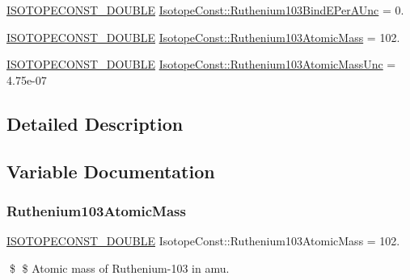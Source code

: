 \begin{DoxyCompactItemize}
\mbox{\hyperlink{group___isotope_const-_macros_ga8f45a7272ce02c0b4c65c44636ed719a}{I\+S\+O\+T\+O\+P\+E\+C\+O\+N\+S\+T\+\_\+\+D\+O\+U\+B\+LE}} \mbox{\hyperlink{group___isotope_const-_ruthenium-_ru103_ga6a4aaf13ef4a94b00440cd0dc87e8a78}{Isotope\+Const\+::\+Ruthenium103\+Bind\+E\+Per\+A\+Unc}} = 0.
\item 
\mbox{\hyperlink{group___isotope_const-_macros_ga8f45a7272ce02c0b4c65c44636ed719a}{I\+S\+O\+T\+O\+P\+E\+C\+O\+N\+S\+T\+\_\+\+D\+O\+U\+B\+LE}} \mbox{\hyperlink{group___isotope_const-_ruthenium-_ru103_gacc8c35af94e585e424d8370479b3b077}{Isotope\+Const\+::\+Ruthenium103\+Atomic\+Mass}} = 102.
\item 
\mbox{\hyperlink{group___isotope_const-_macros_ga8f45a7272ce02c0b4c65c44636ed719a}{I\+S\+O\+T\+O\+P\+E\+C\+O\+N\+S\+T\+\_\+\+D\+O\+U\+B\+LE}} \mbox{\hyperlink{group___isotope_const-_ruthenium-_ru103_ga1191add4699158d48383a1faa433be6e}{Isotope\+Const\+::\+Ruthenium103\+Atomic\+Mass\+Unc}} = 4.\+75e-\/07
\end{DoxyCompactItemize}


\subsection{Detailed Description}


\subsection{Variable Documentation}
\mbox{\label{group___isotope_const-_ruthenium-_ru103_gacc8c35af94e585e424d8370479b3b077}} 
\subsubsection{\texorpdfstring{Ruthenium103\+Atomic\+Mass}{Ruthenium103AtomicMass}}
{\footnotesize\ttfamily \mbox{\hyperlink{group___isotope_const-_macros_ga8f45a7272ce02c0b4c65c44636ed719a}{I\+S\+O\+T\+O\+P\+E\+C\+O\+N\+S\+T\+\_\+\+D\+O\+U\+B\+LE}} Isotope\+Const\+::\+Ruthenium103\+Atomic\+Mass = 102.}

\$ \$ Atomic mass of Ruthenium-\/103 in amu. \mbox{\label{group___isotope_const-_ruthenium-_ru103_ga1191add4699158d48383a1faa433be6e}} 
